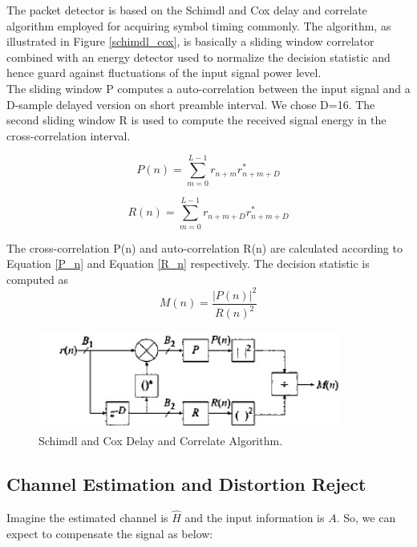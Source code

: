 The packet detector is based on the Schimdl and Cox delay and correlate algorithm employed for acquiring symbol timing commonly. The algorithm, as illustrated in Figure \ref{schimdl_cox}, is basically a sliding window correlator combined with an energy detector used to normalize the decision statistic and hence guard against fluctuations of the input signal power level.\\

The sliding window P computes a auto-correlation between the input signal and a D-sample delayed version on short preamble interval. We chose D=16. The second sliding window R is used to compute the received signal energy in the cross-correlation interval.

\begin{equation} \label{P_n}
P(n) = \sum\limits_{m=0}^{L-1} r_{n+m} r^{*}_{n+m+D}
\end{equation}

\begin{equation} \label{R_n}
 R(n) = \sum\limits_{m=0}^{L-1} r_{n+m+D} r^{*}_{n+m+D}
\end{equation}

The cross-correlation P(n) and auto-correlation R(n) are calculated according to Equation \ref{P_n} and Equation \ref{R_n} respectively. The decision statistic is computed as\\

\begin{equation} \label{M_n}
M(n)= \dfrac{|P(n)|^{2}}{R(n)^{2}}
\end{equation}

\begin{figure}[h!]
\centering
\includegraphics[width=10cm]{content/fig/schimdl_cox.JPG}
\caption{Schimdl and Cox Delay and Correlate Algorithm.}
\label{fig:schimdl_cox}
\end{figure}

\subsection{Channel Estimation and Distortion Reject}
\label{section:channel_est}

Imagine the estimated channel is $\hat{H}$ and the input information is $A$. So, we can expect to compensate the signal as below:\\

